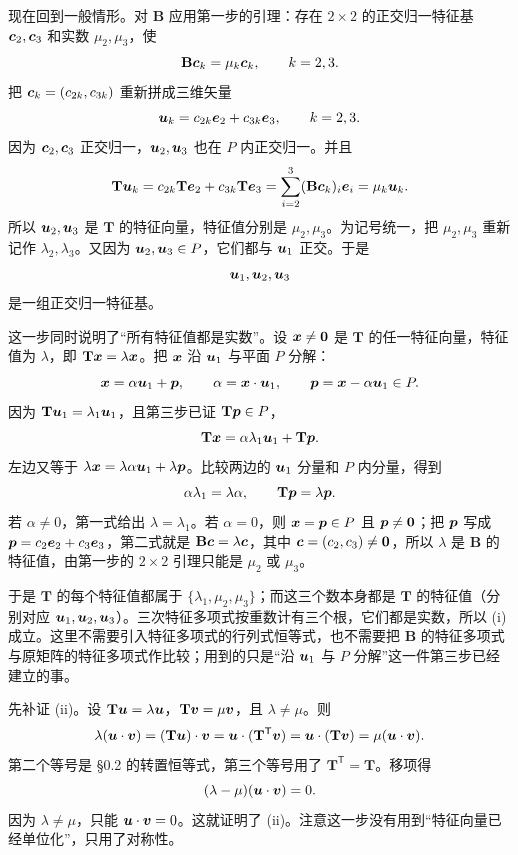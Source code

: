 \documentclass[11pt]{ctexart}
\newcommand{\ten}[1]{\mathbf{#1}}
\newcommand{\step}[1]{\par\smallskip\noindent{\color{violetdeep}\bfseries #1}\hspace{0.35em}}
\begin{document}
现在回到一般情形。对 $\ten B$ 应用第一步的引理：存在 $2\times2$ 的正交归一特征基 $\boldsymbol{c}_2,\boldsymbol{c}_3$ 和实数 $\mu_2,\mu_3$，使
\[
\ten B\vect c_k=\mu_k\vect c_k,\qquad k=2,3 .
\]
把 $\boldsymbol{c}_k=(c_{2k},c_{3k})$ 重新拼成三维矢量
\[
\boldsymbol{u}_k=c_{2k}\boldsymbol{e}_2+c_{3k}\boldsymbol{e}_3,\qquad k=2,3 .
\]
因为 $\boldsymbol{c}_2,\boldsymbol{c}_3$ 正交归一，$\boldsymbol{u}_2,\boldsymbol{u}_3$ 也在 $P$ 内正交归一。并且
\[
\ten T\vect u_k
=c_{2k}\ten T\vect e_2+c_{3k}\ten T\vect e_3
=\sum_{i=2}^{3}(\ten B\vect c_k)_i\vect e_i
=\mu_k\vect u_k .
\]
所以 $\boldsymbol{u}_2,\boldsymbol{u}_3$ 是 $\ten T$ 的特征向量，特征值分别是 $\mu_2,\mu_3$。为记号统一，把 $\mu_2,\mu_3$ 重新记作 $\lambda_2,\lambda_3$。又因为 $\boldsymbol{u}_2,\boldsymbol{u}_3\in P$，它们都与 $\boldsymbol{u}_1$ 正交。于是
\[
\boldsymbol{u}_1,\boldsymbol{u}_2,\boldsymbol{u}_3
\]
是一组正交归一特征基。

这一步同时说明了“所有特征值都是实数”。设 $\boldsymbol{x}\ne\boldsymbol{0}$ 是 $\ten T$ 的任一特征向量，特征值为 $\lambda$，即 $\ten T\vect x=\lambda\vect x$。把 $\boldsymbol{x}$ 沿 $\boldsymbol{u}_1$ 与平面 $P$ 分解：
\[
\boldsymbol{x}=\alpha\boldsymbol{u}_1+\boldsymbol{p},\qquad
\alpha=\boldsymbol{x}\cdot\boldsymbol{u}_1,\qquad
\boldsymbol{p}=\boldsymbol{x}-\alpha\boldsymbol{u}_1\in P .
\]
因为 $\ten T\vect u_1=\lambda_1\vect u_1$，且第三步已证 $\ten T\vect p\in P$，
\[
\ten T\vect x=\alpha\lambda_1\vect u_1+\ten T\vect p .
\]
左边又等于 $\lambda\boldsymbol{x}=\lambda\alpha\boldsymbol{u}_1+\lambda\boldsymbol{p}$。比较两边的 $\boldsymbol{u}_1$ 分量和 $P$ 内分量，得到
\[
\alpha\lambda_1=\lambda\alpha,\qquad
\ten T\vect p=\lambda\vect p .
\]
若 $\alpha\ne0$，第一式给出 $\lambda=\lambda_1$。若 $\alpha=0$，则 $\boldsymbol{x}=\boldsymbol{p}\in P$ 且 $\boldsymbol{p}\ne\boldsymbol{0}$；把 $\boldsymbol{p}$ 写成 $\boldsymbol{p}=c_2\boldsymbol{e}_2+c_3\boldsymbol{e}_3$，第二式就是 $\ten B\vect c=\lambda\vect c$，其中 $\boldsymbol{c}=(c_2,c_3)\ne\boldsymbol{0}$，所以 $\lambda$ 是 $\ten B$ 的特征值，由第一步的 $2\times2$ 引理只能是 $\mu_2$ 或 $\mu_3$。

于是 $\ten T$ 的每个特征值都属于 $\{\lambda_1,\mu_2,\mu_3\}$；而这三个数本身都是 $\ten T$ 的特征值（分别对应 $\boldsymbol{u}_1,\boldsymbol{u}_2,\boldsymbol{u}_3$）。三次特征多项式按重数计有三个根，它们都是实数，所以 (i) 成立。这里不需要引入特征多项式的行列式恒等式，也不需要把 $\ten B$ 的特征多项式与原矩阵的特征多项式作比较；用到的只是“沿 $\boldsymbol{u}_1$ 与 $P$ 分解”这一件第三步已经建立的事。

\step{第五步：正交性与分解式。}
先补证 (ii)。设 $\ten T\vect u=\lambda\vect u$，$\ten T\vect v=\mu\vect v$，且 $\lambda\ne\mu$。则
\[
\lambda(\vect u\cdot\vect v)
=(\ten T\vect u)\cdot\vect v
=\vect u\cdot(\ten T^{\mathsf T}\vect v)
=\vect u\cdot(\ten T\vect v)
=\mu(\vect u\cdot\vect v).
\]
第二个等号是 §0.2 的转置恒等式，第三个等号用了 $\ten T^{\mathsf T}=\ten T$。移项得
\[
(\lambda-\mu)(\boldsymbol{u}\cdot\boldsymbol{v})=0 .
\]
因为 $\lambda\ne\mu$，只能 $\boldsymbol{u}\cdot\boldsymbol{v}=0$。这就证明了 (ii)。注意这一步没有用到“特征向量已经单位化”，只用了对称性。
\end{document}
